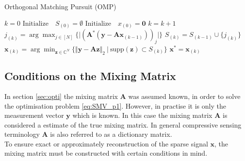 \begin{algorithm}[H]
\caption{Orthogonal Matching Pursuit (OMP)}\label{alg:OMP}
\begin{algorithmic}[1]
			\State$k = 0$			
			\State$\text{Initialize} \quad S_{(0)} =\emptyset$ 
			\State$\text{Initialize} \quad x_{(0)} =\mathbf{0}$
                \State$k = k + 1$
				\State$j_{(k)} = \arg \max_{j \in [N]} \lbrace \vert (\mathbf{A}^\ast (\mathbf{y} - \mathbf{Ax}_{(k-1)}))_j \vert \rbrace$				
				\State$S_{(k)} = S_{(k-1)} \cup \lbrace j_{(k)} \rbrace$ 
				\State$\mathbf{x}_{(k)} = \arg \min_{\mathbf{z} \in \mathbb{C}^N} \lbrace \Vert \mathbf{y} - \mathbf{Az} \Vert_2 \  \vert \ \text{supp}(\mathbf{z}) \subset S_{(k)} \rbrace$
          		\EndWhile
          		\State$\mathbf{x}^\ast = \mathbf{x}_{(k)}$
            \EndProcedure
        \end{algorithmic} 
        \label{alg:OMP}
\end{algorithm}

\subsection{Conditions on the Mixing Matrix}\label{sec:dic_conditions}
In section \ref{sec:opti} the mixing matrix $\mathbf{A}$ was assumed known, in order to solve the optimisation problem \eqref{eq:SMV_p1}. 
However, in practise it is only the measurement vector $\mathbf{y}$ which is known. 
In this case the mixing matrix $\mathbf{A}$ is considered a estimate of the true mixing matrix. 
In general compressive sensing terminology $\mathbf{A}$ is also referred to as a dictionary matrix.
\\
To ensure exact or approximately reconstruction of the sparse signal $\mathbf{x}$, the mixing matrix must be constructed with certain conditions in mind. 

